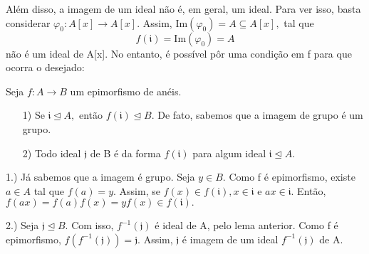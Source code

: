 \documentclass[AlgebraII/algebraII_notes.tex]{subfiles}
\begin{document}
Além disso, a imagem de um ideal não é, em geral, um ideal. Para ver isso, basta considerar \(\varphi_{0}:A[x]\rightarrow A[x].\)
Assim, \(\mathrm{Im}(\varphi_{0}) = A\subseteq A[x],\) tal que
\[
	f(\mathfrak{i}) = \mathrm{Im}(\varphi_{0}) = A
\]
não é um ideal de A[x]. No entanto, é possível pôr uma condição em f para que ocorra o desejado:
\begin{lemma*}
	Seja \(f:A\rightarrow B\) um epimorfismo de anéis.
	\begin{itemize}
		\item[1)] Se \(\mathfrak{i}\trianglelefteq{A},\) então \(f(\mathfrak{i})\trianglelefteq{B}.\) De fato, sabemos que a imagem
		      de grupo é um grupo.
		\item[2)] Todo ideal \(\mathfrak{j}\) de B é da forma \(f(\mathfrak{i})\) para algum ideal \(\mathfrak{i}\trianglelefteq{A}.\)
	\end{itemize}
\end{lemma*}
\begin{proof*}
	1.) Já sabemos que a imagem é grupo. Seja \(y\in B.\) Como f é epimorfismo, existe
	\(a\in A\) tal que \(f(a) = y.\) Assim, se \(f(x)\in f(\mathfrak{i}), x\in \mathfrak{i}\) e
	\(ax\in \mathfrak{i}.\) Então, \(f(ax) = f(a)f(x) = y f(x)\in f(\mathfrak{i}).\)

	2.) Seja \(\mathfrak{j}\trianglelefteq{B}.\) Com isso, \(f^{-1}(\mathfrak{j})\) é ideal de A, pelo lema anterior.
	Como f é epimorfismo, \(f(f^{-1}(\mathfrak{j})) = \mathfrak{j}.\) Assim, \(\mathfrak{j}\) é imagem de um ideal
	\(f^{-1}(\mathfrak{j})\) de A. \qedsymbol
\end{proof*}
\end{document}

